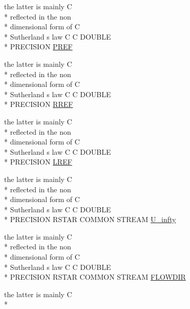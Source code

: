 \begin{DoxyCompactItemize}
\item 
the latter is mainly C \\*
reflected in the non \\*
dimensional form of C \\*
Sutherland s law C C D\-O\-U\-B\-L\-E \\*
P\-R\-E\-C\-I\-S\-I\-O\-N \hyperlink{msa20_2home_2abonfi_2_c_f_d__codes_2_eul_f_s_83_82_83_2include_2stream_8com_ac527abdf107d6bddcbc6a80631e1ab59}{P\-R\-E\-F}
\item 
the latter is mainly C \\*
reflected in the non \\*
dimensional form of C \\*
Sutherland s law C C D\-O\-U\-B\-L\-E \\*
P\-R\-E\-C\-I\-S\-I\-O\-N \hyperlink{msa20_2home_2abonfi_2_c_f_d__codes_2_eul_f_s_83_82_83_2include_2stream_8com_a79112f231fb3da56eef3fc61c1e77bbd}{R\-R\-E\-F}
\item 
the latter is mainly C \\*
reflected in the non \\*
dimensional form of C \\*
Sutherland s law C C D\-O\-U\-B\-L\-E \\*
P\-R\-E\-C\-I\-S\-I\-O\-N \hyperlink{msa20_2home_2abonfi_2_c_f_d__codes_2_eul_f_s_83_82_83_2include_2stream_8com_a19d492a15feda819ed49e580c6a1568f}{L\-R\-E\-F}
\item 
the latter is mainly C \\*
reflected in the non \\*
dimensional form of C \\*
Sutherland s law C C D\-O\-U\-B\-L\-E \\*
P\-R\-E\-C\-I\-S\-I\-O\-N R\-S\-T\-A\-R C\-O\-M\-M\-O\-N S\-T\-R\-E\-A\-M \hyperlink{msa20_2home_2abonfi_2_c_f_d__codes_2_eul_f_s_83_82_83_2include_2stream_8com_a396c12357ce60c0aaccd169e136b5d9a}{U\-\_\-infty}
\item 
the latter is mainly C \\*
reflected in the non \\*
dimensional form of C \\*
Sutherland s law C C D\-O\-U\-B\-L\-E \\*
P\-R\-E\-C\-I\-S\-I\-O\-N R\-S\-T\-A\-R C\-O\-M\-M\-O\-N S\-T\-R\-E\-A\-M \hyperlink{msa20_2home_2abonfi_2_c_f_d__codes_2_eul_f_s_83_82_83_2include_2stream_8com_af5929b7a58c2e64c3b9908fd35bc0e5a}{F\-L\-O\-W\-D\-I\-R}
\item 
the latter is mainly C \\*

\end{DoxyCompactItemize}
